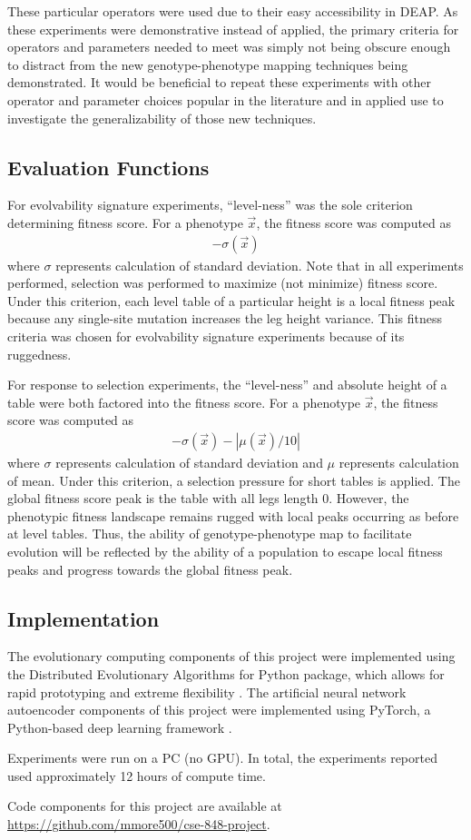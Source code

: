 These particular operators were used due to their easy accessibility in DEAP.
As these experiments were demonstrative instead of applied, the primary criteria
for operators and parameters needed to meet was simply not being obscure enough to distract from the new genotype-phenotype mapping techniques being demonstrated.
It would be beneficial to repeat these experiments with other operator and parameter choices popular in the literature and in applied use to investigate the generalizability of those new techniques.


\subsection{Evaluation Functions}

For evolvability signature experiments, ``level-ness'' was the sole criterion determining fitness score.
For a phenotype $\vec{x}$, the fitness score was computed as
\begin{align*}
-\sigma(\vec{x})
\end{align*}
where $\sigma$ represents calculation of standard deviation.
Note that in all experiments performed, selection was performed to maximize (not minimize) fitness score.
Under this criterion, each level table of a particular height is a local fitness peak because any single-site mutation increases the leg height variance.
This fitness criteria was chosen for evolvability signature experiments because of its ruggedness.

For response to selection experiments, the ``level-ness'' and absolute height of a table were both factored into the fitness score.
For a phenotype $\vec{x}$, the fitness score was computed as
\begin{align*}
-\sigma(\vec{x}) - |\mu(\vec{x})/10|
\end{align*}
where $\sigma$ represents calculation of standard deviation and $\mu$ represents calculation of mean.
Under this criterion, a selection pressure for short tables is applied.
The global fitness score peak is the table with all legs length 0.
However, the phenotypic fitness landscape remains rugged with local peaks occurring as before at level tables.
Thus, the ability of genotype-phenotype map to facilitate evolution will be reflected by the ability of a population to escape local fitness peaks and progress towards the global fitness peak.

\subsection{Implementation}

The evolutionary computing components of this project were implemented using the Distributed Evolutionary Algorithms for Python package, which allows for rapid prototyping and extreme flexibility \cite{fortin2012deap}.
The artificial neural network autoencoder components of this project were implemented using PyTorch, a Python-based deep learning framework \cite{paszke2017pytorch}.

Experiments were run on a PC (no GPU).
In total, the experiments reported used approximately 12 hours of compute time.

Code components for this project are available at \url{https://github.com/mmore500/cse-848-project}.
